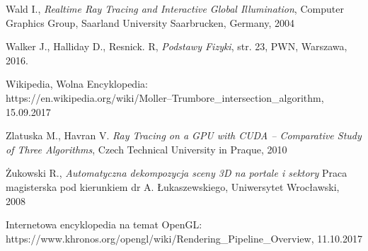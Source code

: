 \documentclass[eng,pl,printmode,openany]{mgr}
\begin{document}
\begin{thebibliography}{99}
	Wald I.,
	\emph{Realtime Ray Tracing and Interactive Global Illumination},
	Computer Graphics Group, Saarland University Saarbrucken, Germany,
	2004

	Walker J., Halliday D., Resnick. R,
	\emph{Podstawy Fizyki}, str. 23,
	PWN, Warszawa,
	2016.

	Wikipedia, Wolna Encyklopedia:\\ 
	https://en.wikipedia.org/wiki/Moller–Trumbore\_intersection\_algorithm, 15.09.2017
	
	Zlatuska M., Havran V. 
	\emph{Ray Tracing on a GPU with CUDA –
Comparative Study of Three Algorithms},
	Czech Technical University in Praque,
	2010
	
	Żukowski R.,
	\emph{Automatyczna dekompozycja sceny 3D na portale i sektory}
	Praca magisterska pod kierunkiem dr A. Łukaszewskiego,
	Uniwersytet Wrocławski,
	2008
	
	Internetowa encyklopedia na temat OpenGL: \\
	https://www.khronos.org/opengl/wiki/Rendering\_Pipeline\_Overview, 11.10.2017
	
\end{thebibliography}
\end{document}

